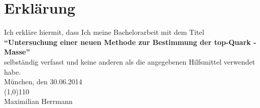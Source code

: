 \documentclass[
a4paper,                                %
twoside,                                %
BCOR1.4cm,                      %
ngerman,                                %
10pt,                           %
headings=normal,                %
headsepline,                    %
clearplainpage, %
final,                                  %
div=14,
parskip=full
]{scrbook}
\begin{document}
\listoffigures

\chapter*{Erkl\"arung}

Ich erkl\"are hiermit, dass Ich meine Bachelorarbeit mit dem Titel
\vspace*{0.5cm}
\\
\textbf{"`Untersuchung einer neuen Methode zur
Bestimmung der top-Quark - Masse"'}
\vspace*{0.5cm}
\\
selbst\"andig verfasst und keine anderen als die angegebenen Hilfsmittel verwendet habe.
\vspace*{2cm}
\\
M\"unchen, den 30.06.2014
\vspace*{0.5cm}
\\
\line(1,0){110}
\\
Maximilian Herrmann
\thispagestyle{empty}
\end{document}
